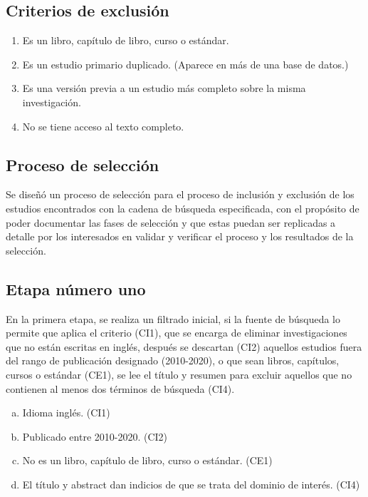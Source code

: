 \documentclass[conference,onecolumn,10pt]{IEEEtran}
\begin{document}
\subsection{Criterios de exclusión}
\begin{enumerate}[CE-1.-]
  \item{Es un libro, capítulo de libro, curso o estándar.}
  \item{Es un estudio primario duplicado. (Aparece en más de una base de datos.)}
  \item{Es una versión previa a un estudio más completo sobre la misma investigación.}
  \item{No se tiene acceso al texto completo.}
\end{enumerate}
\newpage

\subsection{Proceso de selección}
Se diseñó un proceso de selección para el proceso de inclusión y exclusión de los estudios 
encontrados con la cadena de búsqueda especificada, con el propósito de poder documentar 
las fases de selección y que estas puedan ser replicadas a detalle por los 
interesados en validar y verificar el proceso y los resultados de la selección.

\subsection{Etapa número uno}
En la primera etapa, se realiza un filtrado inicial, si la fuente de búsqueda 
lo permite que aplica el criterio (CI1), que se encarga de eliminar 
investigaciones que no están escritas en inglés, después 
se descartan (CI2) aquellos estudios fuera del rango de publicación designado (2010-2020), 
o que sean libros, capítulos, cursos o estándar (CE1), se lee el título y resumen para 
excluir aquellos que no contienen al menos dos términos de búsqueda (CI4).

\begin{enumerate}[(a)]
  \item{Idioma inglés. (CI1)}
  \item{Publicado entre 2010-2020. (CI2)}
  \item{No es un libro, capítulo de libro, curso o estándar. (CE1)}
  \item{El título y abstract dan indicios de que se trata del dominio de interés. (CI4)}
\end{enumerate}
\end{document}
